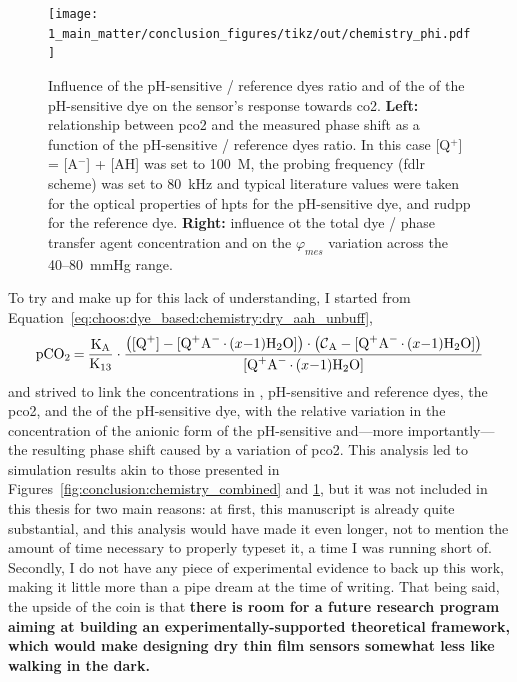 \begin{figure} %
	\centering
	\texttt{[image: 1\_main\_matter/conclusion\_figures/tikz/out/chemistry\_phi.pdf]}
	\caption[Influence of the \pKa{} and dyes ratio on the sensor's response towards \gls{co2}.]{Influence of the pH-sensitive / reference dyes ratio and of the \pKa{} of the pH-sensitive dye on the sensor's response towards \gls{co2}. \textbf{Left:} relationship between \gls{pco2} and the measured phase shift as a function of the pH-sensitive / reference dyes ratio. In this case [Q$^+$] = [A$^-$] + [AH] was set to 100~\textmu{}M, the probing frequency (\gls{fdlr} scheme) was set to 80~kHz and typical literature values were taken for the optical properties of \gls{hpts} for the pH-sensitive dye, and \gls{rudpp} for the reference dye. \textbf{Right:} influence ot the total dye / phase transfer agent concentration and \pKa{} on the $\varphi_{mes}$ variation across the 40--80~mmHg range.}
	\label{fig:conclusion:chemistry_phi}
\end{figure}

To try and make up for this lack of understanding, I started from Equation~\ref{eq:choos:dye_based:chemistry:dry_aah_unbuff}, \ie{}
\begin{equation}
	\ce{pCO_2 = \frac{K_A}{K_{13}}}\cdot \frac{\left(\ce{[Q^+] - [Q^+A^-.$(x-1)$H_2O]}\right)\cdot\left(\ce{\mathcal{C}_A - [Q^+A^-.$(x-1)$H_2O]}\right)}{\ce{[Q^+A^-.$(x-1)$H_2O]}}
\end{equation}
and strived to link the concentrations in , pH-sensitive and reference dyes, the \gls{pco2}, and the \pKa{} of the pH-sensitive dye, with the relative variation in the concentration of the anionic form of the pH-sensitive and---more importantly---the resulting phase shift caused by a variation of \gls{pco2}. This analysis led to simulation results akin to those presented in Figures~\ref{fig:conclusion:chemistry_combined} and \ref{fig:conclusion:chemistry_phi}, but it was not included in this thesis for two main reasons: at first, this manuscript is already quite substantial, and this analysis would have made it even longer, not to mention the amount of time necessary to properly typeset it, a time I was running short of. Secondly, I do not have any piece of experimental evidence to back up this work, making it little more than a pipe dream at the time of writing. That being said, the upside of the coin is that \textbf{there is room for a future research program aiming at building an experimentally-supported theoretical framework, which would make designing dry thin film sensors somewhat less like walking in the dark.}

